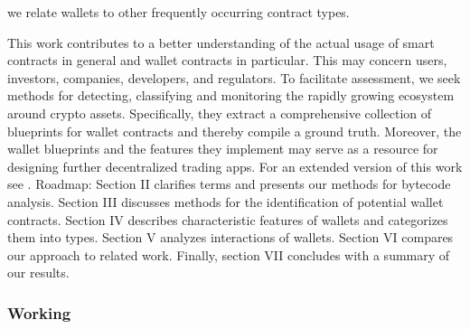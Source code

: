 \documentclass[12pt]{article}
\begin{document}
we relate wallets to other frequently occurring contract types.\par
This work contributes to a better understanding of the
actual usage of smart contracts in general and wallet contracts
in particular. This may concern users, investors, companies,
developers, and regulators. To facilitate assessment, we seek
methods for detecting, classifying and monitoring the rapidly
growing ecosystem around crypto assets. Specifically, they
extract a comprehensive collection of blueprints for wallet
contracts and thereby compile a ground truth. Moreover, the
wallet blueprints and the features they implement may serve
as a resource for designing further decentralized trading apps.
For an extended version of this work see .
Roadmap: Section II clarifies terms and presents our methods for bytecode analysis. Section III discusses methods for
the identification of potential wallet contracts. Section IV
describes characteristic features of wallets and categorizes
them into types. Section V analyzes interactions of wallets.
Section VI compares our approach to related work. Finally,
section VII concludes with a summary of our results.




\newpage
\subsubsection{Working}
\end{document}
